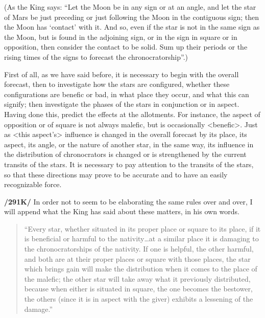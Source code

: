 (As the King says: “Let the Moon be in any sign or at an angle, and let the star of Mars be just preceding or just following the Moon in the contiguous sign; then the Moon has ‘contact’ with it. And so, even if the star is not in the same sign as the Moon, but is found in the adjoining sign, or in the sign in square or in opposition, then consider the contact to be solid. Sum up their periods or the rising times of
the signs to forecast the chronocratorship”.)

First of \mnm all, as we have said before, it is necessary to begin with the overall forecast, then to investigate how the stars are configured, whether these configurations are benefic or bad, in what place they occur, and what this can signify; then investigate the phases of the stars in conjunction or in aspect. Having done this, predict the effects at the allotments. For \mndl instance, the aspect of opposition or of square is not always malefic, but is occasionally <benefic>. Just as <this aspect’s> influence is changed in the overall forecast by its place, its aspect, its angle, or the nature of another star, in the same way, its influence in the distribution of chronocrators is changed or is strengthened by the current transits of the stars. It is necessary to pay attention to the transits of the stars, so that these directions may prove to be accurate and to have an easily recognizable force.

\textbf{/291K/} In order not to seem to be elaborating the same rules over and over, I will append what the King has said about these matters, in his own words.
\begin{quote}
“Every star, whether situated in its proper place or square to its place, if it is beneficial or harmful to the nativity…at a similar place it is damaging to the chronocratorships of the nativity. If one is helpful, the other harmful, and both are at their proper places or square with those places, the star which brings gain will make the distribution when it comes to the place of the malefic; the other star will take away what it previously distributed, because when either is situated in square, the one becomes the bestower, the others (since it is in aspect with the giver) exhibits a lessening of the damage.”
\end{quote}

